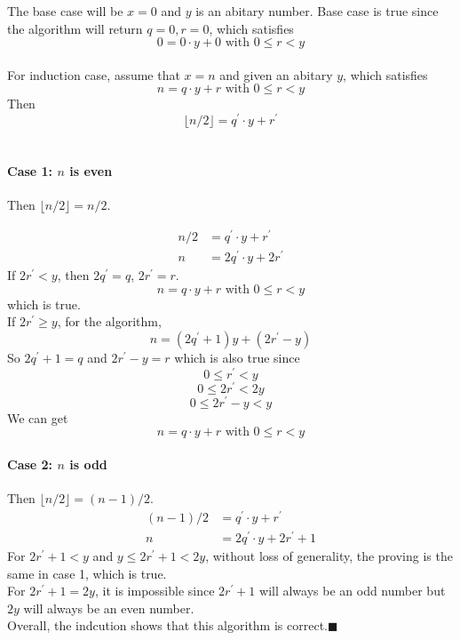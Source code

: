 \documentclass{article}
\begin{document}
The base case will be $x = 0$ and $y$ is an abitary number.
Base case is true since the algorithm will return $q = 0, r = 0$, which satisfies
$$0 = 0 \cdot y + 0 \mbox{ with } 0 \leq r < y $$
\\
For induction case, assume that $x = n$ and given an abitary $y$, which satisfies
$$n = q \cdot y + r \mbox{ with } 0\leq r < y $$
Then 
$$\lfloor n/2 \rfloor = q^\prime \cdot y + r^\prime $$
\\
\paragraph{Case 1: $n$ is even}

Then $\lfloor n/2 \rfloor = n/2$.


\begin{align}
    n/2  &= q^\prime \cdot y + r^\prime \nonumber \\
    n &=  2q^\prime \cdot y + 2r^\prime \nonumber
\end{align}
If $2r^\prime < y$, then $2q^\prime = q$, $2r^\prime = r$.
$$n = q \cdot y + r \mbox{ with } 0 \leq r < y$$ which is true.
\\
If $2r^\prime \geq y$, for the algorithm, 
$$n = (2q^\prime+1)y + (2r^\prime-y)$$
So $2q^\prime + 1 = q$ and $2r^\prime - y = r$ which is also true since
$$ 0 \leq r^\prime < y $$$$  0 \leq 2r^\prime < 2y $$$$  0 \leq 2r^\prime - y < y  $$
We can get 
$$n = q \cdot y + r \mbox{ with } 0 \leq r < y$$




\paragraph{Case 2: $n$ is odd}

Then $\lfloor n/2 \rfloor = (n-1)/2$.
\begin{align}
    (n-1)/2 &= q^\prime \cdot y + r^\prime \nonumber \\
    n &=  2q^\prime \cdot y + 2r^\prime + 1 \nonumber
\end{align}
For $2r^\prime + 1 < y$ and $y\leq 2r^\prime + 1 < 2y$, without loss of generality, the proving is the same in case 1, which is true.
\\
For $2r^\prime + 1 = 2y$, it is impossible since  $2r^\prime + 1$ will always be an odd number but $2y$ will always be an even number.
\\
Overall, the indcution shows that this algorithm is correct.$\blacksquare$
\end{document}
